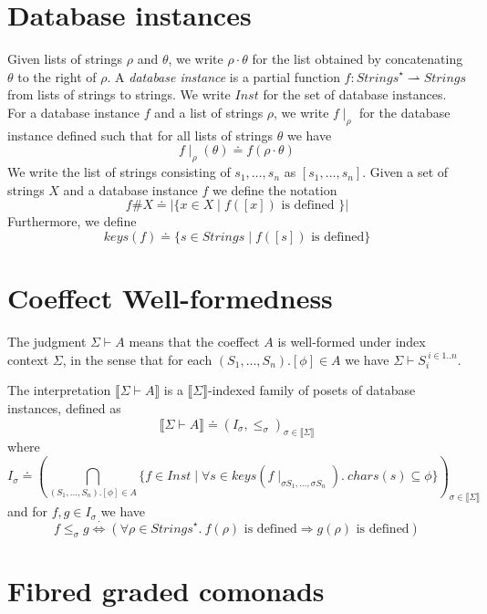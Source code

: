 \documentclass{article}
\newcommand{\sem}[1]{\llbracket #1 \rrbracket}
\newcommand{\sdisp}[1]{
\left( #1 \right)
}
\begin{document}
\section*{Database instances}

Given lists of strings $\rho$ and $\theta$, we write $\rho \cdot \theta$ for the list obtained by concatenating $\theta$ to the right of $\rho$. A \emph{database instance} is a partial function $f : \mathit{Strings}^{\star} \rightharpoonup \mathit{Strings}$ from lists of strings to strings. We write $\mathit{Inst}$ for the set of database instances. For a database instance $f$ and a list of strings $\rho$, we write $f \! \mid_\rho$ for the database instance defined such that for all lists of strings $\theta$ we have $$f \! \mid_\rho \! (\theta) \doteq f(\rho \cdot \theta)$$ We write the list of strings consisting of $s_1, \ldots, s_n$ as $[s_1,\ldots,s_n]$. Given a set of strings $X$ and a database instance $f$ we define the notation $$f \# X \doteq | \{ x \in X \mid f([x]) \text{ is defined } \} |$$ Furthermore, we define $$\mathit{keys}(f) \doteq \{ s \in \mathit{Strings} \mid f([s]) \text{ is defined} \}$$

\section*{Coeffect Well-formedness}

The judgment $\Sigma \vdash A$ means that the coeffect $A$ is well-formed under index context $\Sigma$,
in the sense that for each $(S_1,\ldots,S_n).[\phi] \in A$ we have $\Sigma \vdash S_i^{~i \in 1..n}$.

The interpretation $\sem{\Sigma \vdash A}$ is a $\sem{\Sigma}$-indexed family of posets of database instances, defined as $$\sem{\Sigma \vdash A} \doteq (I_\sigma, \leq_\sigma)_{\sigma \in \sem{\Sigma}}$$ where $$I_\sigma \doteq \sdisp{\bigcap_{(S_1,\ldots,S_n).[\phi] \in A} \{ f \in \mathit{Inst} \mid \forall s \in \mathit{keys}(f \! \mid_{\sigma S_1, \ldots, \sigma S_n}).~\mathit{chars}(s) \subseteq \phi \}}_{\sigma \in \sem{\Sigma}}$$ and for $f,g \in I_{\sigma}$ we have
$$f \leq_\sigma g \overset{\cdot}{\Leftrightarrow} (\forall \rho \in \mathit{Strings}^\star.~f(\rho) \text{ is defined} \Rightarrow g(\rho) \text{ is defined})$$
 

\section*{Fibred graded comonads}
 
\end{document}
